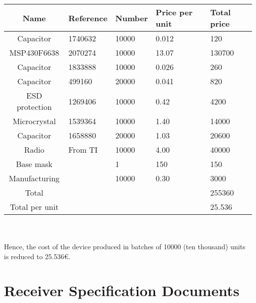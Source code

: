 \begin{tabular}{| c |l | l | l | l |} 
		\hline
		Name & Reference & Number & Price per unit & Total price\\ \hline
	 	Capacitor & 1740632 & 10000 & 0.012  & 120\\ \hline
	 	MSP430F6638 & 2070274 & 10000 & 13.07 & 130700\\ \hline
	 	Capacitor & 1833888 & 10000 & 0.026  & 260\\ \hline
	 	Capacitor & 499160 & 20000 & 0.041  & 820\\ \hline
	 	ESD protection & 1269406 & 10000 & 0.42  & 4200\\ \hline
	 	Microcrystal & 1539364 & 10000 & 1.40 & 14000\\ \hline
	 	Capacitor & 1658880 & 20000 & 1.03  & 20600\\ \hline
	 	Radio & From TI & 10000 & 4.00 & 40000\\ \hline
		Base mask &  & 1 & 150 & 150\\ \hline
		Manufacturing & & 10000 & 0.30 & 3000\\ \hline
	 	Total &  &  &  & 255360\\ \hline
	 	Total per unit &  &  &  & 25.536\\	\hline
\end{tabular}\\\\

	Hence, the cost of the device produced in batches of 10000 (ten thousand) units is reduced to 25.536{\small \euro}.


\chapter{Receiver Specification Documents}
\label{ch:specs}

